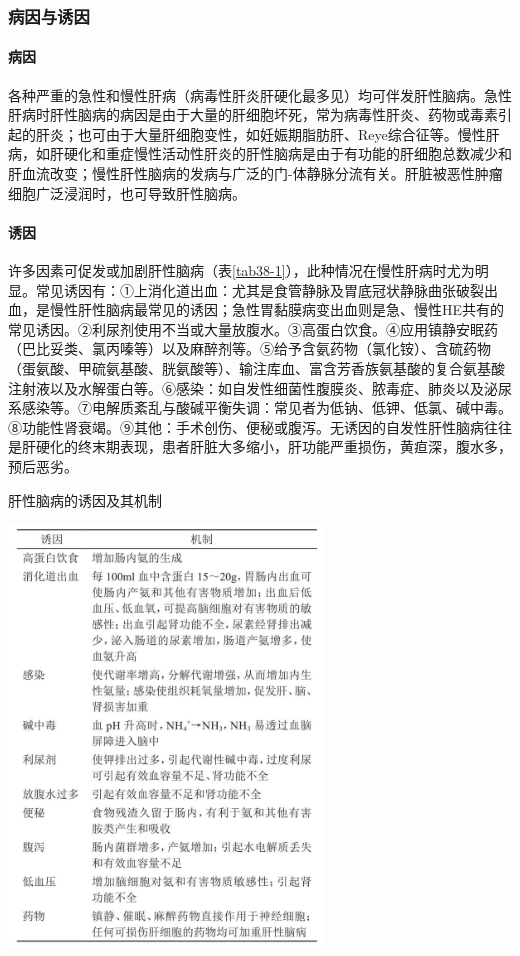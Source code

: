 \subsubsection{病因与诱因}

\paragraph{病因}

各种严重的急性和慢性肝病（病毒性肝炎肝硬化最多见）均可伴发肝性脑病。急性肝病时肝性脑病的病因是由于大量的肝细胞坏死，常为病毒性肝炎、药物或毒素引起的肝炎；也可由于大量肝细胞变性，如妊娠期脂肪肝、Reye综合征等。慢性肝病，如肝硬化和重症慢性活动性肝炎的肝性脑病是由于有功能的肝细胞总数减少和肝血流改变；慢性肝性脑病的发病与广泛的门-体静脉分流有关。肝脏被恶性肿瘤细胞广泛浸润时，也可导致肝性脑病。

\paragraph{诱因}

许多因素可促发或加剧肝性脑病（表\ref{tab38-1}），此种情况在慢性肝病时尤为明显。常见诱因有：①上消化道出血：尤其是食管静脉及胃底冠状静脉曲张破裂出血，是慢性肝性脑病最常见的诱因；急性胃黏膜病变出血则是急、慢性HE共有的常见诱因。②利尿剂使用不当或大量放腹水。③高蛋白饮食。④应用镇静安眠药（巴比妥类、氯丙嗪等）以及麻醉剂等。⑤给予含氨药物（氯化铵）、含硫药物（蛋氨酸、甲硫氨基酸、胱氨酸等）、输注库血、富含芳香族氨基酸的复合氨基酸注射液以及水解蛋白等。⑥感染：如自发性细菌性腹膜炎、脓毒症、肺炎以及泌尿系感染等。⑦电解质紊乱与酸碱平衡失调：常见者为低钠、低钾、低氯、碱中毒。⑧功能性肾衰竭。⑨其他：手术创伤、便秘或腹泻。无诱因的自发性肝性脑病往往是肝硬化的终末期表现，患者肝脏大多缩小，肝功能严重损伤，黄疸深，腹水多，预后恶劣。

\begin{table}[htbp]
\centering
\caption{肝性脑病的诱因及其机制}
\label{tab38-1}
\includegraphics[width=3.28125in,height=4.41667in]{./images/Image00148.jpg}
\end{table}

